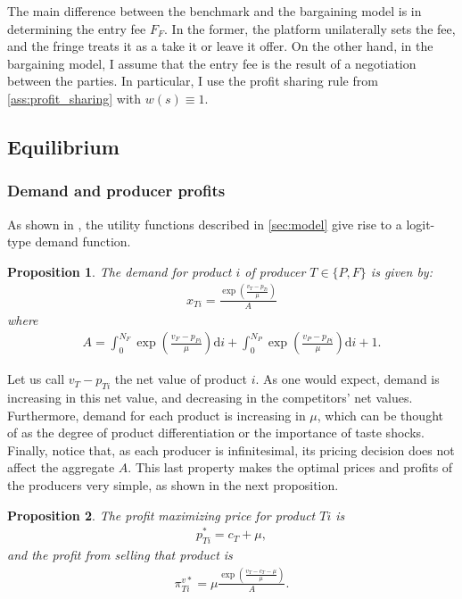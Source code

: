 \documentclass[a4paper]{article}
\newtheorem{proposition}{Proposition}
\newcommand{\di}{\mathrm{d}i}
\begin{document}
The main difference between the benchmark and the bargaining model is in determining the entry fee $F_F$.
In the former, the platform unilaterally sets the fee, and the fringe treats it as a take it or leave it offer.
On the other hand, in the bargaining model, I assume that the entry fee is the result of a negotiation between the parties.
In particular, I use the profit sharing rule from \cref{ass:profit_sharing} with $w(s) \equiv 1$.


\subsection{Equilibrium}

\subsubsection{Demand and producer profits}

As shown in \textcite[]{anderson2021hybrid}, the utility functions described in \cref{sec:model} give rise to a logit-type demand function.
\begin{proposition}
    The demand for product $i$ of producer $T \in \{P, F\}$ is given by:
    \begin{align*}
        x_{Ti} = \frac{\exp\left( \frac{v_T - p_{Ti}}{\mu} \right)}{A}
    \end{align*}
    where
    \begin{align}
        A = \int_0^{N_F} \exp\left( \frac{v_F - p_{Fi}}{\mu} \right) \di + \int_0^{N_P} \exp\left( \frac{v_P - p_{Pi}}{\mu} \right) \di + 1.
        \label{eq:aggregate}
    \end{align}
\end{proposition}

Let us call $v_T - p_{Ti}$ the net value of product $i$.
As one would expect, demand is increasing in this net value, and decreasing in the competitors' net values.
Furthermore, demand for each product is increasing in $\mu$, which can be thought of as the degree of product differentiation or the importance of taste shocks.
Finally, notice that, as each producer is infinitesimal, its pricing decision does not affect the aggregate $A$.
This last property makes the optimal prices and profits of the producers very simple, as shown in the next proposition.
\begin{proposition}
    The profit maximizing price for product $Ti$ is
    \begin{align*}
        p^*_{Ti} = c_T + \mu,
    \end{align*}
    and the profit from selling that product is
    \begin{align}
        \pi^{v*}_{Ti} = \mu \frac{\exp \left( \frac{v_T - c_T - \mu}{\mu} \right)}{A}.
        \label{eq:optimal_profit}
    \end{align}
\end{proposition}
\end{document}
